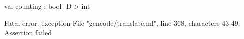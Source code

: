 \chklistingfalse
{}
\begin{ChkListingMsg}
val counting : bool -D-> int 
\end{ChkListingMsg}
\begin{ChkListingErr}
Fatal error: exception File "gencode/translate.ml", line 368, characters 43-49: Assertion failed
\end{ChkListingErr}
